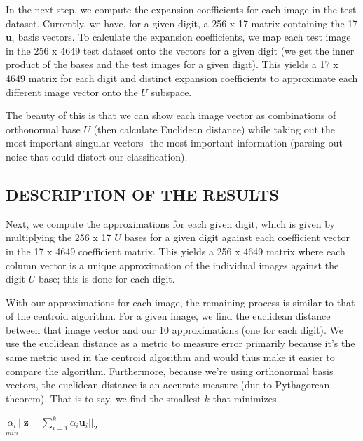 \documentclass[dvipsnames,12pt]{article} %
\newcommand{\bs}[1]{\boldsymbol{#1}}
\begin{document}
        \vskip 06pt

        \hskip 12pt In the next step, we compute the expansion coefficients for each image in the test dataset. Currently, we have, for a given digit, a 256 x 17 matrix containing the 17 $\bs{u_i}$ basis vectors. To calculate the expansion coefficients, we map each test image in the 256 x 4649 test dataset onto the vectors for a given digit (we get the inner product of the bases and the test images for a given digit). This yields a 17 x 4649 matrix for each digit and distinct expansion coefficients to approximate each different image vector onto the $U$ subspace.

        \vskip 06pt

        \hskip 12pt The beauty of this is that we can show each image vector as combinations of orthonormal base $U$ (then calculate Euclidean distance) while taking out the most important singular vectors- the most important information (parsing out noise that could distort our classification).
        
        \subsection{DESCRIPTION OF THE RESULTS}
          \label{SECT 04.02:SVD RESULTS}

        \hskip 12pt Next, we compute the approximations for each given digit, which is given by multiplying the 256 x 17 $U$ bases for a given digit against each coefficient vector in the 17 x 4649 coefficient matrix. This yields a 256 x 4649 matrix where each column vector is a unique approximation of the individual images against the digit $U$ base; this is done for each digit.

        \vskip 06pt

        \hskip 12pt With our approximations for each image, the remaining process is similar to that of the centroid algorithm. For a given image, we find the euclidean distance between that image vector and our 10 approximations (one for each digit). We use the euclidean distance as a metric to measure error primarily because it's the same metric used in the centroid algorithm and would thus make it easier to compare the algorithm. Furthermore, because we're using orthonormal basis vectors, the euclidean distance is an accurate measure (due to Pythagorean theorem). That is to say, we find the smallest $k$ that minimizes
        
        \begin{center}
            $\underset{min}{\alpha_i}||\bs{z}-\sum^k_{i=1}\alpha_i\bs{u}_i||_2$
        \end{center}
        
\end{document}
